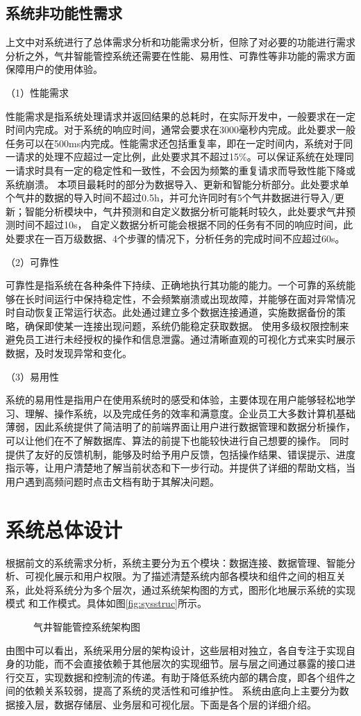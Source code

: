 \subsection{系统非功能性需求}
上文中对系统进行了总体需求分析和功能需求分析，但除了对必要的功能进行需求分析之外，气井智能管控系统还需要在性能、易用性、可靠性等非功能的需求方面保障用户的使用体验。

（1）性能需求

性能需求是指系统处理请求并返回结果的总耗时，在实际开发中，一般要求在一定时间内完成。对于系统的响应时间，通常会要求在3000毫秒内完成。此处要求一般任务可以在500ms内完成。性能需求还包括重复率，即在一定时间内，系统对于同一请求的处理不应超过一定比例，此处要求其不超过15\%。可以保证系统在处理同一请求时具有一定的稳定性和一致性，不会因为频繁的重复请求而导致性能下降或系统崩溃。
本项目最耗时的部分为数据导入、更新和智能分析部分。此处要求单个气井的数据的导入时间不超过0.5h，并可允许同时有5个气井数据进行导入/更新；智能分析模块中，气井预测和自定义数据分析可能耗时较久，此处要求气井预测时间不超过10s，
自定义数据分析可能会根据不同的任务有不同的响应时间，此处要求在一百万级数据、4个步骤的情况下，分析任务的完成时间不应超过60s。

（2）可靠性

可靠性是指系统在各种条件下持续、正确地执行其功能的能力。一个可靠的系统能够在长时间运行中保持稳定性，不会频繁崩溃或出现故障，并能够在面对异常情况时自动恢复正常运行状态。此处通过建立多个数据连接通道，实施数据备份的策略，确保即使某一连接出现问题，系统仍能稳定获取数据。
使用多级权限控制来避免员工进行未经授权的操作和信息泄露。通过清晰直观的可视化方式来实时展示数据，及时发现异常和变化。

（3）易用性

系统的易用性是指用户在使用系统时的感受和体验，主要体现在用户能够轻松地学习、理解、操作系统，以及完成任务的效率和满意度。企业员工大多数计算机基础薄弱，因此系统提供了简洁明了的前端界面让用户进行数据管理和数据分析操作，可以让他们在不了解数据库、算法的前提下也能较快进行自己想要的操作。
同时提供了友好的反馈机制，能够及时给予用户反馈，包括操作结果、错误提示、进度指示等，让用户清楚地了解当前状态和下一步行动。并提供了详细的帮助文档，当用户遇到高频问题时点击文档有助于其解决问题。
\section{系统总体设计}
根据前文的系统需求分析，系统主要分为五个模块：数据连接、数据管理、智能分析、可视化展示和用户权限。为了描述清楚系统内部各模块和组件之间的相互关系，此处将系统分为多个层次，通过系统架构图的方式，图形化地展示系统的实现模式
和工作模式。具体如图\ref{fig:sysstruc}所示。
\begin{figure}[H]
    \centering
    \caption{气井智能管控系统架构图}
\end{figure}
由图中可以看出，系统采用分层的架构设计，这些层相对独立，各自专注于实现自身的功能，而不会直接依赖于其他层次的实现细节。层与层之间通过暴露的接口进行交互，实现数据和控制流的传递。有助于降低系统内部的耦合度，即各个组件之间的依赖关系较弱，提高了系统的灵活性和可维护性。
系统由底向上主要分为数据接入层，数据存储层、业务层和可视化层。下面是各个层的详细介绍。

